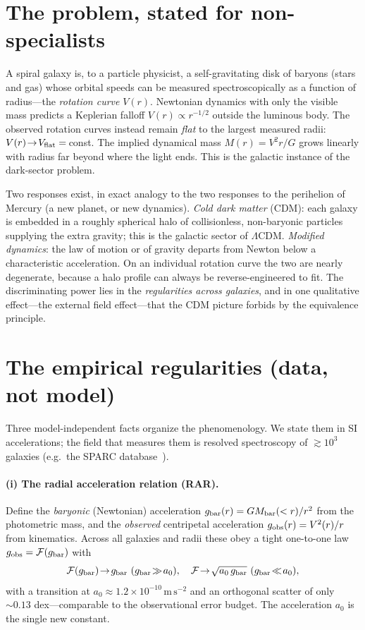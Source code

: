 \documentclass[aps,prd,twocolumn,10pt,nofootinbib,superscriptaddress]{revtex4-2}
\begin{document}
\section{The problem, stated for non-specialists}
A spiral galaxy is, to a particle physicist, a self-gravitating disk of baryons (stars and gas) whose orbital
speeds can be measured spectroscopically as a function of radius---the \emph{rotation curve} $V(r)$. Newtonian
dynamics with only the visible mass predicts a Keplerian falloff $V(r)\!\propto\!r^{-1/2}$ outside the luminous
body. The observed rotation curves instead remain \emph{flat} to the largest measured radii: $V(r)\!\to\!V_{\rm
flat}=\,$const. The implied dynamical mass $M(r)=V^2 r/G$ grows linearly with radius far beyond where the light
ends. This is the galactic instance of the dark-sector problem.

Two responses exist, in exact analogy to the two responses to the perihelion of Mercury (a new planet, or new
dynamics). \emph{Cold dark matter} (CDM): each galaxy is embedded in a roughly spherical halo of collisionless,
non-baryonic particles supplying the extra gravity; this is the galactic sector of $\Lambda$CDM. \emph{Modified
dynamics}: the law of motion or of gravity departs from Newton below a characteristic acceleration. On an individual
rotation curve the two are nearly degenerate, because a halo profile can always be reverse-engineered to fit. The
discriminating power lies in the \emph{regularities across galaxies}, and in one qualitative effect---the external
field effect---that the CDM picture forbids by the equivalence principle.

\section{The empirical regularities (data, not model)}
Three model-independent facts organize the phenomenology. We state them in SI accelerations; the field that
measures them is resolved spectroscopy of $\gtrsim10^3$ galaxies (e.g.\ the SPARC database~\cite{Lelli2016}).

\paragraph{(i) The radial acceleration relation (RAR).} Define the \emph{baryonic} (Newtonian) acceleration
$g_{\rm bar}(r)=GM_{\rm bar}(<r)/r^2$ from the photometric mass, and the \emph{observed} centripetal acceleration
$g_{\rm obs}(r)=V^2(r)/r$ from kinematics. Across all galaxies and radii these obey a tight one-to-one law
$g_{\rm obs}=\mathcal{F}(g_{\rm bar})$ with~\cite{McGaugh2016}
\begin{equation}
\mathcal{F}(g_{\rm bar})\!\to\!g_{\rm bar}\ (g_{\rm bar}\!\gg\!a_0),\quad
\mathcal{F}\!\to\!\sqrt{a_0\,g_{\rm bar}}\ (g_{\rm bar}\!\ll\!a_0),
\label{eq:rar}
\end{equation}
with a transition at $a_0\approx1.2\times10^{-10}\,\mathrm{m\,s^{-2}}$ and an orthogonal scatter of only $\sim0.13$
dex---comparable to the observational error budget. The acceleration $a_0$ is the single new constant.
\end{document}
